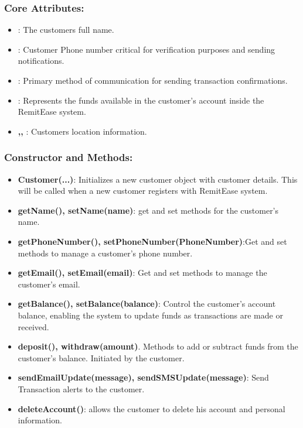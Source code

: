 \documentclass[onecolumn, letterpaper, ]{report}
\begin{document}
            \subsubsection{Core Attributes:}
            \begin{itemize}
                \item \textbf{}: The customers full name.
                \item \textbf{}: Customer Phone number critical for verification purposes and sending notifications.
                \item \textbf{}: Primary method of communication for sending transaction confirmations.
                \item \textbf{}: Represents the funds available in the customer's account inside the RemitEase system.
                \item \textbf{,, }: Customers location information. 
            \end{itemize}
            \subsubsection{Constructor and Methods:}
            \begin{itemize}
                \item \textbf{Customer(...)}: Initializes a new customer object with customer details. This will be called when a new customer registers with RemitEase system.
                \item \textbf{getName(), setName(name)}: get and set methods for the customer's name.
                \item  \textbf{getPhoneNumber(), setPhoneNumber(PhoneNumber)}:Get and set methods to manage a customer's phone number.
                \item \textbf{getEmail(), setEmail(email)}: Get and set methods to manage the customer's email.
                \item \textbf{getBalance(), setBalance(balance)}: Control the customer's account balance, enabling the system to update funds as transactions are made or received.
                \item \textbf{deposit(), withdraw(amount)}. Methods to add or subtract funds from the customer's balance. Initiated by the customer.
                \item \textbf{sendEmailUpdate(message), sendSMSUpdate(message)}: Send Transaction alerts to the customer.
                \item \textbf{deleteAccount()}: allows the customer to delete his account and personal information.
            \end{itemize}
        
\end{document}
